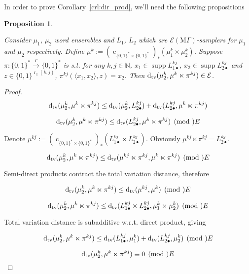 \documentclass{article}
\numberwithin{equation}{section}
\theoremstyle{definition}
\theoremstyle{plain}
\newtheorem{proposition}{Proposition}[section]
\newcommand{\Bool}{\{0,1\}}
\newcommand{\Words}{{\Bool^*}}
\DeclareMathOperator{\Supp}{supp}
\DeclareMathOperator{\R}{r}
\DeclareMathOperator{\En}{c}
\newcommand{\Dtv}{\operatorname{d}_{\textnormal{tv}}}
\newcommand{\Nats}{\mathbb{N}}
\newcommand{\Chev}[1]{\langle #1 \rangle}
\newcommand{\MGrow}{\mathrm{M}\Gamma}
\newcommand{\Fall}{\mathcal{E}}
\newcommand{\Scheme}{\xrightarrow{\Gamma}}
\begin{document}
In order to prove Corollary~\ref{crl:dir_prod}, we'll need the following propositions

\begin{samepage}
\begin{proposition}
\label{prp:tbd}

Consider $\mu_1$, $\mu_2$ word ensembles and $L_1$, $L_2$ which are $\Fall(\MGrow)$-samplers for $\mu_1$ and $\mu_2$ respectively. Define ${\mu^k:=(\En_{\Words \times \Words})_*(\mu_1^k \times \mu_2^k)}$. Suppose $\pi: \Words \Scheme \Words$ is s.t. for any $k,j \in \Nats$, $x_1 \in \Supp L_{1\bullet}^{kj}$, ${x_2 \in \Supp L_{2\bullet}^{kj}}$ and $z \in \Bool^{\R_\pi(k,j)}$, $\pi^{kj}(\Chev{x_1,x_2},z)=x_2$. Then $\Dtv(\mu_2^k, \mu^k \ltimes \pi^{kj}) \in \Fall$.

\end{proposition}
\end{samepage}

\begin{proof}

$$\Dtv(\mu_2^k, \mu^k \ltimes \pi^{kj}) \leq \Dtv(\mu_2^k,L_{2\bullet}^{kj})+\Dtv(L_{2\bullet}^{kj}, \mu^k \ltimes \pi^{kj})$$

$$\Dtv(\mu_2^k, \mu^k \ltimes \pi^{kj}) \leq \Dtv(L_{2\bullet}^{kj}, \mu^k \ltimes \pi^{kj}) \pmod \Fall$$

Denote $\mu^{kj}:=(\En_{\Words \times \Words})_*(L_{1\bullet}^{kj} \times L_{2\bullet}^{kj})$. Obviously $\mu^{kj}\ltimes \pi^{kj}=L_{2\bullet}^{kj}$.

$$\Dtv(\mu_2^k, \mu^k \ltimes \pi^{kj}) \leq \Dtv( \mu^{kj} \ltimes \pi^{kj},  \mu^k \ltimes \pi^{kj}) \pmod \Fall$$

Semi-direct products contract the total variation distance, therefore

$$\Dtv(\mu_2^k, \mu^k \ltimes \pi^{kj}) \leq \Dtv(\mu^{kj},  \mu^k) \pmod \Fall$$

$$\Dtv(\mu_2^k, \mu^k \ltimes \pi^{kj}) \leq \Dtv(L_{1\bullet}^{kj} \times L_{2\bullet}^{kj}, \mu_1^k \times \mu_2^k) \pmod \Fall$$

Total variation distance is subadditive w.r.t. direct product, giving

$$\Dtv(\mu_2^k, \mu^k \ltimes \pi^{kj}) \leq \Dtv(L_{1\bullet}^{kj}, \mu_1^k) + \Dtv(L_{2\bullet}^{kj}, \mu_2^k) \pmod \Fall$$

$$\Dtv(\mu_2^k, \mu^k \ltimes \pi^{kj}) \equiv 0 \pmod \Fall$$

\end{proof}
\end{document}
